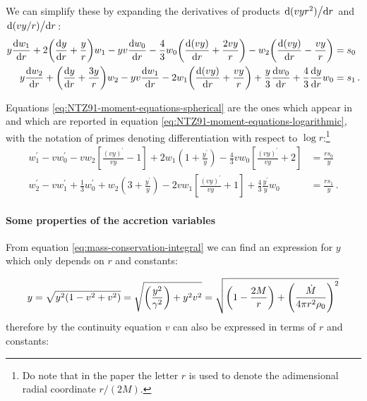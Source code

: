 \documentclass[main.tex]{subfiles}
\begin{document}
We can simplify these by expanding the derivatives of products \(\dv*{(vyr^2)}{r}\) and \(\dv*{(vy/r)}{r}\):
\begin{subequations} \label{eq:NTZ91-moment-equations-spherical}
\begin{align}
  y \dv{w_1}{r} + 2 \qty(\dv{y}{r} + \frac{y}{r}) w_1
  -yv \dv{w_0}{r}
  - \frac{4}{3} w_0 \qty(\dv{(v y)}{r} + \frac{2vy}{r})
  - w_2 \qty(\dv{(vy)}{r} - \frac{vy}{r}) &= s_0  \\
  y \dv{w_2}{r} + \qty(\dv{y}{r} + \frac{3y}{r})w_2
  - yv \dv{w_1 }{r}
  - 2 w_1 \qty(\dv{(vy)}{r} + \frac{vy}{r})
  + \frac{y}{3} \dv{w_0}{r} + \frac{4}{3} \dv{y}{r} w_0
  &= s_1\,.
\end{align}
\end{subequations}

Equations \eqref{eq:NTZ91-moment-equations-spherical} are the ones which appear in  \textcite[eq. 4]{NobiliTurollaZampieri:1991dec} and which are reported in equation \eqref{eq:NTZ91-moment-equations-logarithmic}, with the notation of primes denoting differentiation with respect to \(\log r\):\footnote{Do note that in the paper \cite[]{NobiliTurollaZampieri:1991dec} the letter \(r\) is used to denote the adimensional radial coordinate \(r / (2M)\).}
%
\begin{subequations} \label{eq:NTZ91-moment-equations-logarithmic}
    \begin{align}
        w_{1}^{\prime}-v w_{0}^{\prime}
        -v w_{2}\left[\frac{(v y)^{\prime}}{v y}-1\right]
        +2 w_{1}\left(1+\frac{y^{\prime}}{y}\right)
        -\frac{4}{3} v w_{0}\left[\frac{(v y)^{\prime}}{v y}+2\right]&=\frac{r s_{0}}{y} \\
        w_{2}^{\prime}-v w_{1}^{\prime}+\frac{1}{3} w_{0}^{\prime} +w_{2}\left(3+\frac{y^{\prime}}{y}\right)-2 v w_{1}\left[\frac{(v y)^{\prime}}{v y}+1\right]+\frac{4}{3} \frac{y^{\prime}}{y} w_{0} &=\frac{r s_{1}}{y}\,.
    \end{align}
\end{subequations}

\paragraph{Some properties of the accretion variables}

From equation \eqref{eq:mass-conservation-integral} we can find an expression \cite[eq. 18a]{ThorneFLammmangZytkow:1981feb} for \(y\) which only depends on \(r\) and constants:

\begin{equation}
  y = \sqrt{y^2 \qty(1 - v^2 + v^2)}
  = \sqrt{\qty(\frac{y^2}{\gamma^2}) + y^2 v^2}
  = \sqrt{\qty(1 - \frac{2M}{r}) + \qty(\frac{\dot{M}}{4 \pi r^2 \rho_0})^2}
\end{equation}
therefore by the continuity equation \(v\) can also be expressed in terms of \(r\) and constants:
\end{document}
